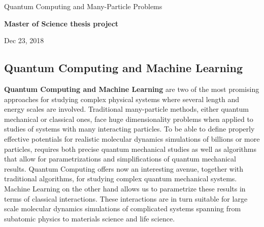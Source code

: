 \documentclass[%
oneside,                 %
final,                   %
10pt]{article}
\begin{document}

\newcommand{\exercisesection}[1]{\subsection*{#1}}






\thispagestyle{empty}

\begin{center}
{\LARGE\bf
\begin{spacing}{1.25}
Quantum Computing and Many-Particle Problems
\end{spacing}
}
\end{center}


\begin{center}
{\bf Master of Science thesis project${}^{}$} \\ [0mm]
\end{center}

\begin{center}
\end{center}
    

\begin{center}
Dec 23, 2018
\end{center}

\vspace{1cm}


\subsection*{Quantum Computing and Machine Learning}



\textbf{Quantum Computing and Machine Learning} are two of the most promising
approaches for studying complex physical systems where several length
and energy scales are involved.  Traditional many-particle methods,
either quantum mechanical or classical ones, face huge dimensionality
problems when applied to studies of systems with many interacting
particles. To be able to define properly effective potentials for
realistic molecular dynamics simulations of billions or more particles,
requires both precise quantum mechanical studies as well as algorithms
that allow for parametrizations and simplifications of quantum
mechanical results. Quantum Computing offers now an interesting
avenue, together with traditional algorithms, for studying complex
quantum mechanical systems. Machine Learning on the other hand allows us to parametrize
these results in terms of classical interactions. These interactions
are in turn suitable for large scale molecular dynamics simulations of
complicated systems spanning from subatomic physics to materials
science and life science.
\end{document}
